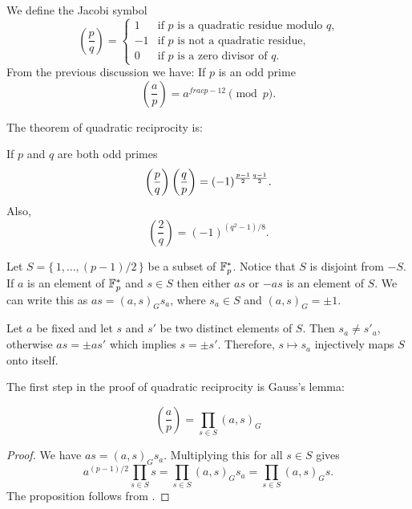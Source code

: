 We define the Jacobi symbol 
\[
\left(\frac{p}{q}\right) = 
  \begin{cases}
    1 & \text{if $p$ is a quadratic residue modulo $q$,} \\
    -1 & \text{if $p$ is not a quadratic residue,} \\
    0 & \text{if $p$ is a zero divisor of $q$.}
  \end{cases}
\]
From the previous discussion we have:
If $p$ is an odd prime
\begin{equation}\label{Jacobi:Sym:Eq}
\left(\frac{a}{p}\right) = a^{frac{p -1}{2}} \pmod{p}.
\end{equation}

The theorem of quadratic reciprocity is:

\begin{proposition}[Gauss]
\label{QuadraticReciproc:Prop}
If $p$ and $q$ are both odd primes
\[
\left({p \over q}\right)  \left({q \over p}\right) =
(-1)^{{p -1 \over 2} {q - 1 \over 2}}.
\]
Also,
\[
\left(\frac{2}{q}\right) = (-1)^{(q^2-1)/8}.
\]
\end{proposition}

Let $S = \{\,1, \ldots, (p-1)/2\,\}$ be a subset of $\mathbb{F}_p^{\ast}$.
Notice that $S$ is disjoint from $-S$.  If $a$ is an element of
$\mathbb{F}_p^{\ast}$ and $s \in S$ then either $as$ or $-as$ is an element of
$S$.  We can write this as $as = (a, s)_G s_a$, where $s_a \in S$ and
$(a, s)_G = \pm 1$.

Let $a$ be fixed and let $s$ and $s'$ be two distinct elements of $S$.
Then $s_a \not= s'_a$, otherwise $as  = \pm as'$ which implies $s =
\pm s'$.  Therefore, $s \mapsto s_a$ injectively maps $S$ onto itself.

The first step in the proof of quadratic reciprocity is Gauss's lemma:

\begin{proposition}
\[
\left(\frac{a}{p}\right) = \prod_{s \in S} (a, s)_G
\]
\end{proposition}

\begin{proof}
We have $as = (a,s)_G s_a$.  Multiplying this for all $s \in S$ gives
\[
a^{(p-1)/2} \prod_{s\in S} s = \prod_{s\in S} (a, s)_G s_a
 = \prod_{s\in S} (a, s)_G s.
\]
The proposition follows from .
\end{proof}


